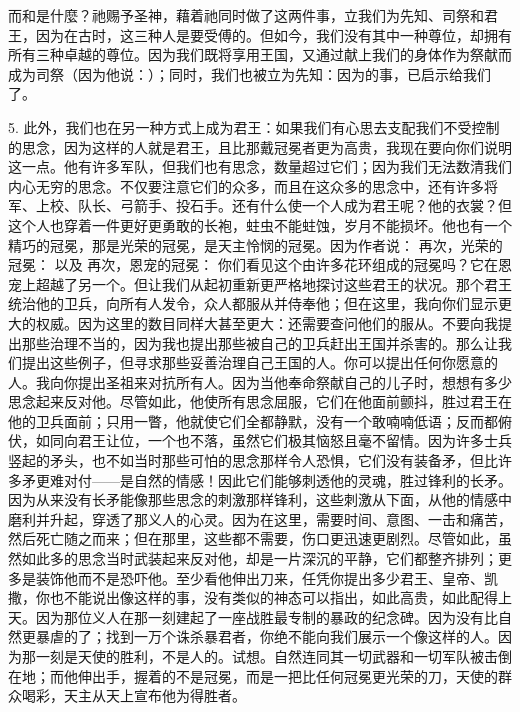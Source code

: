 而和是什麼？祂赐予圣神，藉着祂同时做了这两件事，立我们为先知、司祭和君王，因为在古时，这三种人是要受傅的。但如今，我们没有其中一种尊位，却拥有所有三种卓越的尊位。因为我们既将享用王国，又通过献上我们的身体作为祭献而成为司祭（因为他说：）；同时，我们也被立为先知：因为的事，已启示给我们了。\par

5. 此外，我们也在另一种方式上成为君王：如果我们有心思去支配我们不受控制的思念，因为这样的人就是君王，且比那戴冠冕者更为高贵，我现在要向你们说明这一点。他有许多军队，但我们也有思念，数量超过它们；因为我们无法数清我们内心无穷的思念。不仅要注意它们的众多，而且在这众多的思念中，还有许多将军、上校、队长、弓箭手、投石手。还有什么使一个人成为君王呢？他的衣裳？但这个人也穿着一件更好更勇敢的长袍，蛀虫不能蛀蚀，岁月不能损坏。他也有一个精巧的冠冕，那是光荣的冠冕，是天主怜悯的冠冕。因为作者说： 再次，光荣的冠冕： 以及 再次，恩宠的冠冕： 你们看见这个由许多花环组成的冠冕吗？它在恩宠上超越了另一个。但让我们从起初重新更严格地探讨这些君王的状况。那个君王统治他的卫兵，向所有人发令，众人都服从并侍奉他；但在这里，我向你们显示更大的权威。因为这里的数目同样大甚至更大：还需要查问他们的服从。不要向我提出那些治理不当的，因为我也提出那些被自己的卫兵赶出王国并杀害的。那么让我们提出这些例子，但寻求那些妥善治理自己王国的人。你可以提出任何你愿意的人。我向你提出圣祖来对抗所有人。因为当他奉命祭献自己的儿子时，想想有多少思念起来反对他。尽管如此，他使所有思念屈服，它们在他面前颤抖，胜过君王在他的卫兵面前；只用一瞥，他就使它们全都静默，没有一个敢喃喃低语；反而都俯伏，如同向君王让位，一个也不落，虽然它们极其恼怒且毫不留情。因为许多士兵竖起的矛头，也不如当时那些可怕的思念那样令人恐惧，它们没有装备矛，但比许多矛更难对付——是自然的情感！因此它们能够刺透他的灵魂，胜过锋利的长矛。因为从来没有长矛能像那些思念的刺激那样锋利，这些刺激从下面，从他的情感中磨利并升起，穿透了那义人的心灵。因为在这里，需要时间、意图、一击和痛苦，然后死亡随之而来；但在那里，这些都不需要，伤口更迅速更剧烈。尽管如此，虽然如此多的思念当时武装起来反对他，却是一片深沉的平静，它们都整齐排列；更多是装饰他而不是恐吓他。至少看他伸出刀来，任凭你提出多少君王、皇帝、凯撒，你也不能说出像这样的事，没有类似的神态可以指出，如此高贵，如此配得上天。因为那位义人在那一刻建起了一座战胜最专制的暴政的纪念碑。因为没有比自然更暴虐的了；找到一万个诛杀暴君者，你绝不能向我们展示一个像这样的人。因为那一刻是天使的胜利，不是人的。试想。自然连同其一切武器和一切军队被击倒在地；而他伸出手，握着的不是冠冕，而是一把比任何冠冕更光荣的刀，天使的群众喝彩，天主从天上宣布他为得胜者。\par

